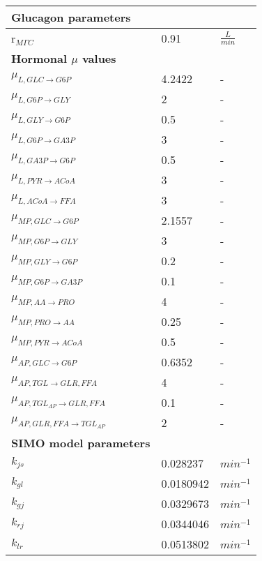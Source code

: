 \begin{supertabular}{lll}
\textbf{Glucagon parameters} \\ \hline
r$_{M\Gamma C}$         & 0.91      & $\frac{L}{min}$   \\ \hline

\textbf{Hormonal $\mu$ values} \\ \hline
$\mu_{L, GLC \rightarrow G6P}$            & 4.2422 & - \\ \hline
$\mu_{L, G6P \rightarrow GLY}$            & 2      & - \\ \hline
$\mu_{L, GLY \rightarrow G6P}$            & 0.5    & - \\ \hline
$\mu_{L, G6P \rightarrow GA3P}$           & 3      & - \\ \hline
$\mu_{L, GA3P \rightarrow G6P}$           & 0.5    & - \\ \hline
$\mu_{L, PYR \rightarrow ACoA}$           & 3      & - \\ \hline
$\mu_{L, ACoA \rightarrow FFA}$           & 3      & - \\ \hline
$\mu_{MP, GLC \rightarrow G6P}$           & 2.1557 & - \\ \hline
$\mu_{MP, G6P \rightarrow GLY}$           & 3      & - \\ \hline
$\mu_{MP, GLY \rightarrow G6P}$           & 0.2    & - \\ \hline
$\mu_{MP, G6P \rightarrow GA3P}$          & 0.1    & - \\ \hline
$\mu_{MP, AA \rightarrow PRO}$            & 4      & - \\ \hline
$\mu_{MP, PRO \rightarrow AA}$            & 0.25      & - \\ \hline
$\mu_{MP, PYR \rightarrow ACoA}$          & 0.5      & - \\ \hline
$\mu_{AP, GLC \rightarrow G6P}$           & 0.6352 & - \\ \hline
$\mu_{AP, TGL \rightarrow GLR, FFA}$      & 4      & - \\ 
\hline
$\mu_{AP, TGL_{AP} \rightarrow GLR, FFA}$ & 0.1    & - \\ \hline
$\mu_{AP, GLR, FFA \rightarrow TGL_{AP}}$ & 2      & - \\ \hline


\textbf{SIMO model parameters} \\ \hline
$k_{js}$        & 0.028237  & $min^{-1}$ \\ \hline
$k_{gl}$        & 0.0180942 & $min^{-1}$ \\ \hline
$k_{gj}$        & 0.0329673 & $min^{-1}$ \\ \hline
$k_{rj}$        & 0.0344046 & $min^{-1}$ \\ \hline
$k_{lr}$        & 0.0513802 & $min^{-1}$

\end{supertabular}%


